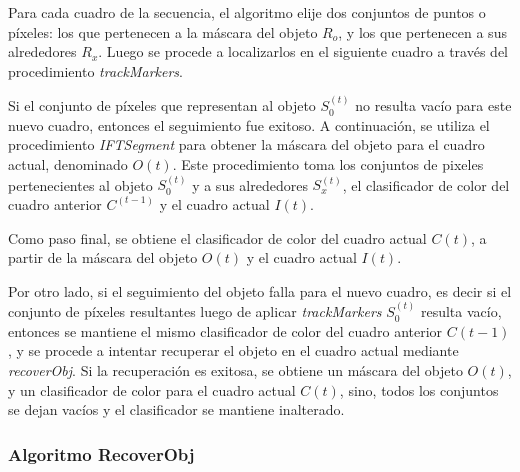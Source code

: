 \documentclass[a4paper,10pt]{article}
\begin{document}
Para cada cuadro de la secuencia, el algoritmo elije dos conjuntos de puntos o píxeles: los que pertenecen a la máscara del objeto $R_{o}$, y los que pertenecen a
sus alrededores $R_{x}$. Luego se procede
a localizarlos en el siguiente cuadro a través del procedimiento \textit{trackMarkers}.

Si el conjunto de píxeles que representan al objeto $S_{0}^{(t)}$ no resulta
vacío para este nuevo cuadro, entonces el seguimiento fue exitoso. A
continuación, se utiliza el procedimiento
\textit{IFTSegment} para obtener la máscara del objeto para el cuadro actual,
denominado $O{(t)}$. Este procedimiento toma los conjuntos de pixeles pertenecientes al objeto $S_{0}^{(t)}$ y
a sus alrededores $S_{x}^{(t)}$, el clasificador de color del cuadro anterior $C^{(t-1)}$ y el
cuadro actual $I{(t)}$.

Como paso final, se obtiene el clasificador de color del cuadro actual $C{(t)}$, a partir de la máscara del objeto $O{(t)}$ y el cuadro actual $I{(t)}$.

Por otro lado, si el seguimiento del objeto falla para el nuevo cuadro, es decir si el conjunto de píxeles resultantes luego de aplicar \textit{trackMarkers} $S_{0}^{(t)}$
resulta vacío, entonces se mantiene el mismo clasificador de color del cuadro anterior $C{(t-1)}$, y se procede
a intentar recuperar el objeto en el cuadro actual mediante \textit{recoverObj}. Si la recuperación
es exitosa, se obtiene un máscara del objeto $O{(t)}$, y un clasificador de color para el cuadro actual $C{(t)}$,
sino, todos los conjuntos se dejan vacíos y el clasificador se mantiene inalterado.\

\subsubsection{Algoritmo RecoverObj}
\end{document}
